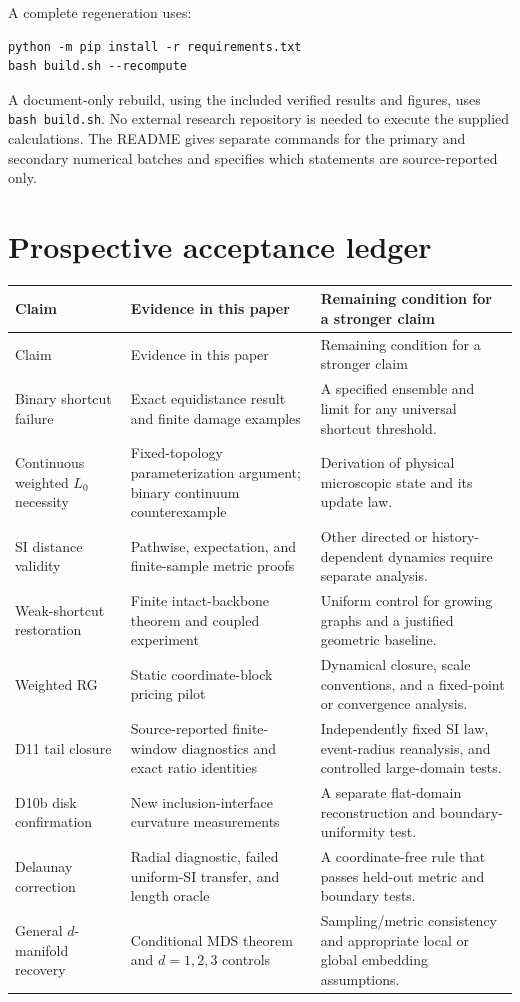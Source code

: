 \documentclass[11pt,letterpaper]{article}
\theoremstyle{definition}
\theoremstyle{remark}
\begin{document}
A complete regeneration uses:
\begin{verbatim}
python -m pip install -r requirements.txt
bash build.sh --recompute
\end{verbatim}
A document-only rebuild, using the included verified results and figures, uses \texttt{bash build.sh}. No external research repository is needed to execute the supplied calculations. The README gives separate commands for the primary and secondary numerical batches and specifies which statements are source-reported only.

\clearpage
\section{Prospective acceptance ledger}\label{app:ledger}
\begin{longtable}{>{\raggedright\arraybackslash}p{.23\linewidth}>{\raggedright\arraybackslash}p{.32\linewidth}>{\raggedright\arraybackslash}p{.37\linewidth}}
\toprule
Claim & Evidence in this paper & Remaining condition for a stronger claim \\
\midrule
\endfirsthead
\toprule Claim & Evidence in this paper & Remaining condition for a stronger claim \\\midrule
\endhead
Binary shortcut failure & Exact equidistance result and finite damage examples & A specified ensemble and limit for any universal shortcut threshold. \\
Continuous weighted $L_0$ necessity & Fixed-topology parameterization argument; binary continuum counterexample & Derivation of physical microscopic state and its update law. \\
SI distance validity & Pathwise, expectation, and finite-sample metric proofs & Other directed or history-dependent dynamics require separate analysis. \\
Weak-shortcut restoration & Finite intact-backbone theorem and coupled experiment & Uniform control for growing graphs and a justified geometric baseline. \\
Weighted RG & Static coordinate-block pricing pilot & Dynamical closure, scale conventions, and a fixed-point or convergence analysis. \\
D11 tail closure & Source-reported finite-window diagnostics and exact ratio identities & Independently fixed SI law, event-radius reanalysis, and controlled large-domain tests. \\
D10b disk confirmation & New inclusion-interface curvature measurements & A separate flat-domain reconstruction and boundary-uniformity test. \\
Delaunay correction & Radial diagnostic, failed uniform-SI transfer, and length oracle & A coordinate-free rule that passes held-out metric and boundary tests. \\
General $d$-manifold recovery & Conditional MDS theorem and $d=1,2,3$ controls & Sampling/metric consistency and appropriate local or global embedding assumptions. \\
\bottomrule
\end{longtable}
\end{document}
